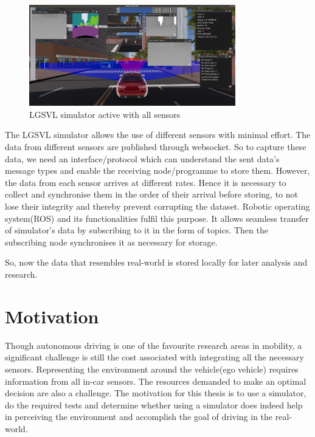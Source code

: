 \begin{figure}[h]
    \begin{center}
        \includegraphics[width = 0.8\textwidth]{figures/png/intro/LGSVL_2_scrot_2020-08-26_20-46-55.png}
    \end{center}
    \caption{LGSVL\cite{LGSVL} simulator active with all sensors}
        \label{fig:LGSVL_constellation_sensors}
\end{figure}

The LGSVL simulator allows the use of different sensors with minimal effort. The data
from different sensors are published through websocket. So to capture these data, we
need an interface/protocol which can understand the sent data's message types and enable the
receiving node/programme to store them. However, the data from each sensor arrives at
different rates. Hence it is necessary to collect and synchronise them in the order of their arrival
before storing, to not lose their integrity and thereby prevent corrupting the dataset.
Robotic operating system(ROS) \cite{ROS2} and its functionalities fulfil
this purpose. It allows seamless transfer of simulator's data by subscribing to it in the
form of topics. Then the subscribing node synchronises it as necessary for storage.

So, now the data that resembles real-world is stored locally for later analysis and
research.


\section{Motivation}

Though autonomous driving is one of the favourite research areas in mobility, 
a significant challenge is still the cost associated with integrating all the necessary sensors.  
Representing the environment around the vehicle(ego vehicle) requires information from all in-car sensors. 
The resources demanded to make an optimal decision are also a challenge. The motivation for this thesis is 
to use a simulator, do the required tests and 
determine whether using a simulator does indeed help in perceiving the environment 
and accomplish the goal of driving in the real-world. 

